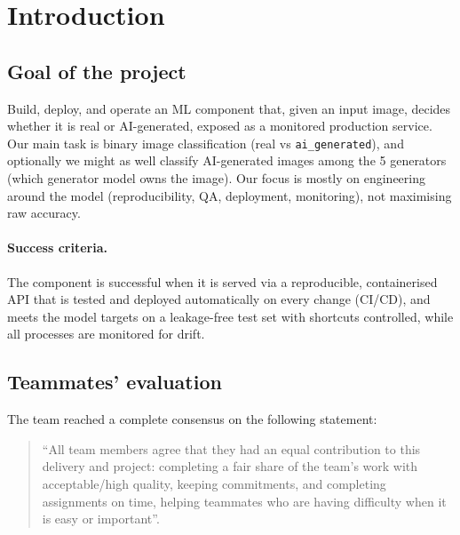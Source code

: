\documentclass[11pt]{article}
\begin{document}
\pagestyle{empty}
\tableofcontents
\newpage
\pagestyle{plain}

\section{Introduction}

\subsection{Goal of the project}
Build, deploy, and operate an ML component that, given an input image, decides whether it is real or AI-generated, exposed as a monitored production service. Our main task is binary image classification (real vs \texttt{ai\_generated}), and optionally we might as well classify AI-generated images among the 5 generators (which generator model owns the image). Our focus is mostly on engineering around the model (reproducibility, QA, deployment, monitoring), not maximising raw accuracy.

\paragraph{Success criteria.} The component is successful when it is served via a reproducible, containerised API that is tested and deployed automatically on every change (CI/CD), and meets the model targets on a leakage-free test set with shortcuts controlled, while all processes are monitored for drift.

\subsection{Teammates' evaluation}
The team reached a complete consensus on the following statement:
\begin{quote}
``All team members agree that they had an equal contribution to this delivery and project: completing a fair share of the team's work with acceptable/high quality, keeping commitments, and completing assignments on time, helping teammates who are having difficulty when it is easy or important''.
\end{quote}

\end{document}
